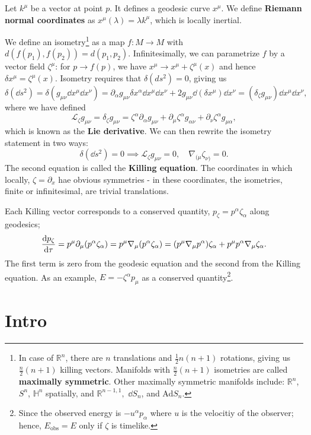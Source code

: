 \documentclass{article}
\begin{document}
Let $k^\mu$ be a vector at point $p$. It defines a geodesic curve $x^\mu$. We define \textbf{Riemann normal coordinates} as $x^\mu(\lambda)=\lambda k^\mu$, which is locally inertial.

We define an isometry\footnote{In case of $\mathbb R^n$, there are $n$ translations and $\frac 12n(n+1)$ rotations, giving us $\frac n2(n+1)$ killing vectors. Manifolds with $\frac n2(n+1)$ isometries are called \textbf{maximally symmetric}. Other maximally symmetric manifolds include: $\mathbb R^n$, $S^n$, $\mathbb H^n$ spatially, and $\mathbb R^{n-1,1},$ $\dd S_n$, and Ad$S_n$. 
} as a map $f:M\to M$ with $d(f(p_1),f(p_2))=d(p_1,p_2)$. Infinitesimally, we can parametrize $f$ by a vector field $\zeta^\mu$: for $p\to f(p)$, we have $x^\mu\to x^\mu+\zeta^\mu(x)$ and hence $\delta x^\mu=\zeta^\mu(x)$. Isometry requires that $\delta(ds^2)=0$, giving us 
$$\delta(\dd s^2)=\delta(g_{\mu\nu}\dd x^\mu\dd x^\nu)=\partial_\alpha g_{\mu\nu}\delta x^\alpha\dd x^\mu\dd x^\nu+2g_{\mu\nu}\dd(\delta x^\mu)\dd x^\nu=(\delta_\zeta g_{\mu\nu})\dd x^\mu\dd x^\nu,$$
where we have defined 
$$\mathcal L_\zeta g_{\mu\nu}=\delta_\zeta g_{\mu\nu}=\zeta^\alpha\partial_\alpha g_{\mu\nu}+\partial_\mu\zeta^\alpha g_{\alpha\nu}+\partial_\nu\zeta^\alpha g_{\mu\alpha},$$
which is known as the \textbf{Lie derivative}. We can then rewrite the isometry statement in two ways:
$$\delta(\dd s^2)=0\implies\mathcal L_\zeta g_{\mu\nu}=0,\quad \nabla_{(\mu}\zeta_{\nu)}=0.$$
The second equation is called the \textbf{Killing equation}. The coordinates in which locally, $\zeta=\partial_x$ hae obvious symmetries - in these coordinates, the isometries, finite or infinitesimal, are trivial translations. 

Each Killing vector corresponds to a conserved quantity, $p_\zeta=p^\alpha\zeta_\alpha$ along geodesics; 
$$\frac{\mathrm{d}p_\zeta}{\mathrm{d}\tau}=p^\mu\partial_\mu(p^\alpha\zeta_\alpha)=p^\mu\nabla_\mu(p^\alpha\zeta_\alpha)=(p^\mu\nabla_\mu p^\alpha)\zeta_\alpha+p^\mu p^\alpha\nabla_\mu\zeta_\alpha.$$
The first term is zero from the geodesic equation and the second from the Killing equation. As an example, $E=-\zeta^\alpha p_\mu$ as a conserved quantity\footnote{Since the observed energy is $-u^\alpha p_\alpha$ where $u$ is the velocitiy of the observer; hence, $E_\text{obs}=E$ only if $\zeta$ is timelike.}.


\pagebreak
\section{Intro}
\end{document}
